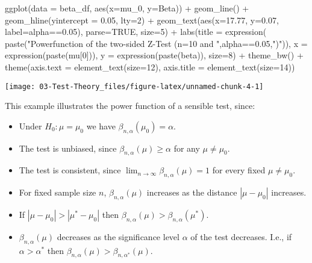 \documentclass[
]{book}
\newenvironment{Shaded}{\begin{snugshade}}{\end{snugshade}}
\newcommand{\AttributeTok}[1]{\textcolor[rgb]{0.77,0.63,0.00}{#1}}
\newcommand{\ConstantTok}[1]{\textcolor[rgb]{0.00,0.00,0.00}{#1}}
\newcommand{\DecValTok}[1]{\textcolor[rgb]{0.00,0.00,0.81}{#1}}
\newcommand{\FloatTok}[1]{\textcolor[rgb]{0.00,0.00,0.81}{#1}}
\newcommand{\FunctionTok}[1]{\textcolor[rgb]{0.00,0.00,0.00}{#1}}
\newcommand{\NormalTok}[1]{#1}
\newcommand{\SpecialCharTok}[1]{\textcolor[rgb]{0.00,0.00,0.00}{#1}}
\newcommand{\StringTok}[1]{\textcolor[rgb]{0.31,0.60,0.02}{#1}}
\providecommand{\tightlist}{%
  \setlength{\itemsep}{0pt}\setlength{\parskip}{0pt}}
\begin{document}
\begin{Shaded}
\begin{Highlighting}[]
\FunctionTok{ggplot}\NormalTok{(}\AttributeTok{data =}\NormalTok{ beta\_df, }\FunctionTok{aes}\NormalTok{(}\AttributeTok{x=}\NormalTok{mu\_0, }\AttributeTok{y=}\NormalTok{Beta)) }\SpecialCharTok{+}
  \FunctionTok{geom\_line}\NormalTok{() }\SpecialCharTok{+}
  \FunctionTok{geom\_hline}\NormalTok{(}\AttributeTok{yintercept =} \FloatTok{0.05}\NormalTok{, }\AttributeTok{lty=}\DecValTok{2}\NormalTok{) }\SpecialCharTok{+} 
  \FunctionTok{geom\_text}\NormalTok{(}\FunctionTok{aes}\NormalTok{(}\AttributeTok{x=}\FloatTok{17.77}\NormalTok{, }\AttributeTok{y=}\FloatTok{0.07}\NormalTok{, }\AttributeTok{label=}\StringTok{\textquotesingle{}alpha==0.05\textquotesingle{}}\NormalTok{), }\AttributeTok{parse=}\ConstantTok{TRUE}\NormalTok{, }\AttributeTok{size=}\DecValTok{5}\NormalTok{) }\SpecialCharTok{+}
  \FunctionTok{labs}\NormalTok{(}\AttributeTok{title =} \FunctionTok{expression}\NormalTok{(}
    \FunctionTok{paste}\NormalTok{(}\StringTok{"Powerfunction of the two{-}sided Z{-}Test (n=10 and "}\NormalTok{,alpha}\SpecialCharTok{==}\FloatTok{0.05}\NormalTok{,}\StringTok{")"}\NormalTok{)), }
       \AttributeTok{x =} \FunctionTok{expression}\NormalTok{(}\FunctionTok{paste}\NormalTok{(mu[}\DecValTok{0}\NormalTok{])),}
       \AttributeTok{y =} \FunctionTok{expression}\NormalTok{(}\FunctionTok{paste}\NormalTok{(beta)), }\AttributeTok{size=}\DecValTok{8}\NormalTok{)    }\SpecialCharTok{+}
  \FunctionTok{theme\_bw}\NormalTok{() }\SpecialCharTok{+}
  \FunctionTok{theme}\NormalTok{(}\AttributeTok{axis.text  =} \FunctionTok{element\_text}\NormalTok{(}\AttributeTok{size=}\DecValTok{12}\NormalTok{),}
           \AttributeTok{axis.title =} \FunctionTok{element\_text}\NormalTok{(}\AttributeTok{size=}\DecValTok{14}\NormalTok{))}
\end{Highlighting}
\end{Shaded}

\begin{center}\texttt{[image: 03-Test-Theory\_files/figure-latex/unnamed-chunk-4-1]} \end{center}

This example illustrates the power function of a sensible test, since:

\begin{itemize}
\tightlist
\item
  Under \(H_0:\mu=\mu_0\) we have \(\beta_{n,\alpha}(\mu_0)=\alpha\).
\item
  The test is unbiased, since \(\beta_{n,\alpha}(\mu)\geq\alpha\) for any \(\mu\neq\mu_0\).
\item
  The test is consistent, since \(\lim_{n\rightarrow\infty} \beta_{n,\alpha}(\mu)=1\) for every fixed \(\mu\neq \mu_0\).
\item
  For fixed sample size \(n\), \(\beta_{n,\alpha}(\mu)\) increases as the distance \(|\mu-\mu_0|\) increases.
\item
  If \(|\mu-\mu_0|>|\mu^*-\mu_0|\) then \(\beta_{n,\alpha}(\mu)>\beta_{n,\alpha}(\mu^*)\).
\item
  \(\beta_{n,\alpha}(\mu)\) decreases as the significance level \(\alpha\) of the test decreases. I.e., if \(\alpha>\alpha^*\) then
  \(\beta_{n,\alpha}(\mu)>\beta_{n,\alpha^*}(\mu)\).
\end{itemize}
\end{document}
